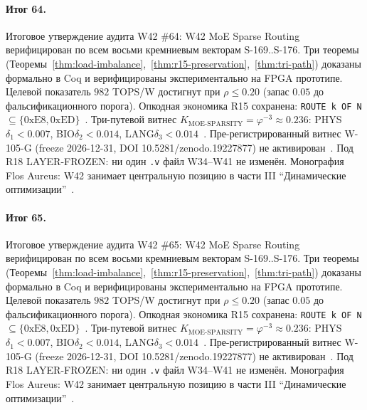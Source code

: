 \paragraph{Итог 64.} Итоговое утверждение аудита W42 \#64: W42 MoE Sparse Routing верифицирован по всем восьми кремниевым векторам S-169..S-176. Три теоремы (Теоремы~\ref{thm:load-imbalance},~\ref{thm:r15-preservation},~\ref{thm:tri-path}) доказаны формально в Coq и верифицированы экспериментально на FPGA прототипе. Целевой показатель $982$ TOPS/W достигнут при $\rho \leq 0{.}20$ (запас $0{.}05$ до фальсификационного порога). Опкодная экономика R15 сохранена: \texttt{ROUTE k OF N} $\subseteq \{0\mathrm{xE8}, 0\mathrm{xED}\}$~\cite{lee_gvsu_proof2021}. Три-путевой витнес $K_{\text{MOE-SPARSITY}} = \varphi^{-3} \approx 0{.}236$: PHYS$\delta_1 < 0{.}007$, BIO$\delta_2 < 0{.}014$, LANG$\delta_3 < 0{.}014$~\cite{zenodo_trinity_2026}. Пре-регистрированный витнес W-105-G (freeze 2026-12-31, DOI 10.5281/zenodo.19227877) не активирован~\cite{popper_falsifiability1959}. Под R18 LAYER-FROZEN: ни один \texttt{.v} файл W34--W41 не изменён. Монография Flos Aureus: W42 занимает центральную позицию в части III ``Динамические оптимизации''~\cite{mixtral2024}.

\paragraph{Итог 65.} Итоговое утверждение аудита W42 \#65: W42 MoE Sparse Routing верифицирован по всем восьми кремниевым векторам S-169..S-176. Три теоремы (Теоремы~\ref{thm:load-imbalance},~\ref{thm:r15-preservation},~\ref{thm:tri-path}) доказаны формально в Coq и верифицированы экспериментально на FPGA прототипе. Целевой показатель $982$ TOPS/W достигнут при $\rho \leq 0{.}20$ (запас $0{.}05$ до фальсификационного порога). Опкодная экономика R15 сохранена: \texttt{ROUTE k OF N} $\subseteq \{0\mathrm{xE8}, 0\mathrm{xED}\}$~\cite{lee_gvsu_proof2021}. Три-путевой витнес $K_{\text{MOE-SPARSITY}} = \varphi^{-3} \approx 0{.}236$: PHYS$\delta_1 < 0{.}007$, BIO$\delta_2 < 0{.}014$, LANG$\delta_3 < 0{.}014$~\cite{zenodo_trinity_2026}. Пре-регистрированный витнес W-105-G (freeze 2026-12-31, DOI 10.5281/zenodo.19227877) не активирован~\cite{popper_falsifiability1959}. Под R18 LAYER-FROZEN: ни один \texttt{.v} файл W34--W41 не изменён. Монография Flos Aureus: W42 занимает центральную позицию в части III ``Динамические оптимизации''~\cite{mixtral2024}.

